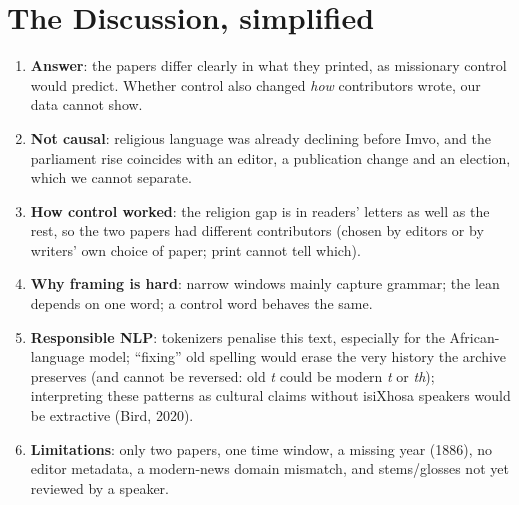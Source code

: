 \documentclass[11pt]{article}
\newcommand{\key}[1]{\textbf{#1}}
\begin{document}
\section{The Discussion, simplified}
\begin{enumerate}
\item \key{Answer}: the papers differ clearly in what they printed, as missionary control would predict. Whether control also changed \emph{how} contributors wrote, our data cannot show.
\item \key{Not causal}: religious language was already declining before Imvo, and the parliament rise coincides with an editor, a publication change and an election, which we cannot separate.
\item \key{How control worked}: the religion gap is in readers' letters as well as the rest, so the two papers had different contributors (chosen by editors or by writers' own choice of paper; print cannot tell which).
\item \key{Why framing is hard}: narrow windows mainly capture grammar; the lean depends on one word; a control word behaves the same.
\item \key{Responsible NLP}: tokenizers penalise this text, especially for the African-language model; ``fixing'' old spelling would erase the very history the archive preserves (and cannot be reversed: old \emph{t} could be modern \emph{t} or \emph{th}); interpreting these patterns as cultural claims without isiXhosa speakers would be extractive (Bird, 2020).
\item \key{Limitations}: only two papers, one time window, a missing year (1886), no editor metadata, a modern-news domain mismatch, and stems/glosses not yet reviewed by a speaker.
\end{enumerate}
\end{document}
